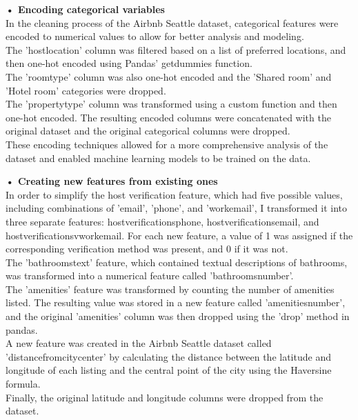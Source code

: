 \documentclass{article}
\begin{document}
\textbf{• Encoding categorical variables}\\
In the cleaning process of the Airbnb Seattle dataset, categorical features were encoded to numerical values to allow for better analysis and modeling. \\
The 'host\textunderscore location' column was filtered based on a list of preferred locations, and then one-hot encoded using Pandas' get\textunderscore dummies function.\\
The 'room\textunderscore type' column was also one-hot encoded and the 'Shared room' and 'Hotel room' categories were dropped. \\
The 'property\textunderscore type' column was transformed using a custom function and then one-hot encoded. 
The resulting encoded columns were concatenated with the original dataset and the original categorical columns were dropped.\\
These encoding techniques allowed for a more comprehensive analysis of the dataset and enabled machine learning models to be trained on the data.\vspace{.5cm}

\textbf{• Creating new features from existing ones}\\
In order to simplify the host verification feature, which had five possible values, including combinations of 'email', 'phone', and 'work\textunderscore email', I transformed it into three separate features: host\textunderscore verifications\textunderscore phone, host\textunderscore verifications\textunderscore email, and host\textunderscore verificationsv\textunderscore work\textunderscore email. For each new feature, a value of 1 was assigned if the corresponding verification method was present, and 0 if it was not.\\
The 'bathrooms\textunderscore text' feature, which contained textual descriptions of bathrooms, was transformed into a numerical feature called 'bathrooms\textunderscore number'.\\
The 'amenities' feature was transformed by counting the number of amenities listed. The resulting value was stored in a new feature called 'amenities\textunderscore number', and the original 'amenities' column was then dropped using the 'drop' method in pandas.\\
A new feature was created in the Airbnb Seattle dataset called 'distance\textunderscore from\textunderscore city\textunderscore center' by calculating the distance between the latitude and longitude of each listing and the central point of the city using the Haversine formula.\\
Finally, the original latitude and longitude columns were dropped from the dataset.\vspace{.5cm}
\end{document}
